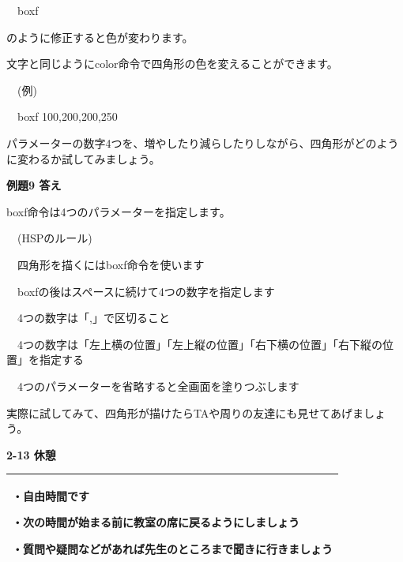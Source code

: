 \documentclass[a4paper,dvipdfmx]{jarticle}
\begin{document}
\ \ boxf


\bigskip

のように修正すると色が変わります。

文字と同じようにcolor命令で四角形の色を変えることができます。


\bigskip

\ \ (例)

\ \ boxf 100,200,200,250


\bigskip

パラメーターの数字4つを、増やしたり減らしたりしながら、四角形がどのように変わるか試してみましょう。


\bigskip


\bigskip

{\bfseries
例題9 答え}


\bigskip

boxf命令は4つのパラメーターを指定します。


\bigskip

\ \ (HSPのルール)


\bigskip

\ \ 四角形を描くにはboxf命令を使います

\ \ boxfの後はスペースに続けて4つの数字を指定します

\ \ 4つの数字は「,」で区切ること

\ \ 4つの数字は「左上横の位置」「左上縦の位置」「右下横の位置」「右下縦の位置」を指定する

\ \ 4つのパラメーターを省略すると全画面を塗りつぶします


\bigskip

実際に試してみて、四角形が描けたらTAや周りの友達にも見せてあげましょう。


\bigskip


\bigskip


\bigskip

{\bfseries
2-13 休憩}


\bigskip

\begin{flushleft}
\tablefirsthead{}
\tablehead{}
\tabletail{}
\tablelasttail{}
\begin{supertabular}{|m{10.733cm}|}
\hline
・自由時間です

・次の時間が始まる前に教室の席に戻るようにしましょう

・質問や疑問などがあれば先生のところまで聞きに行きましょう\\\hline
\end{supertabular}
\end{flushleft}
\end{document}
